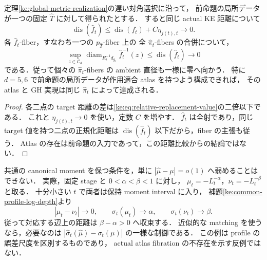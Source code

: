 \begin{corollary}[相対変更後の同じ射影による GH 実現]
\label{ke:relative-replacement-gh}
定理\ref{ke:global-metric-realization}の遅い対角選択に沿って，
前命題の局所データが一つの固定 $\widehat T$ に対して得られたとする．
すると同じ actual KE 距離について
\[
 \operatorname{dis}(\widehat f_t)
 \le\operatorname{dis}(f_t)+C\eta_{j(t),t}\longrightarrow0.
\]
各 $\widehat f_t$-fiber，すなわち一つの $p_{\widehat T}$-fiber 上の
全 $\widehat\pi_t$-fibers の合併について，
\[
 \sup_{z\in\mathcal C_d}
 \operatorname{diam}_{R_t^{-1}d_{g_t}}\widehat f_t^{-1}(z)
 \le\operatorname{dis}(\widehat f_t)\longrightarrow0
\]
である．従って個々の $\widehat\pi_t$-fibers の ambient 直径も一様に零へ向かう．
特に $d=5,6$ で前命題の局所データが作用適合 atlas を持つよう構成できれば，
その atlas と GH 実現は同じ $\widehat\pi_t$ によって達成される．
\end{corollary}

\begin{proof}
各二点の target 距離の差は\eqref{ke:eq:relative-replacement-value}の二倍以下である．
これと $\eta_{j(t),t}\to0$ を使い，定数 $C$ を増やす．
$\widehat f_t$ は全射であり，同じ target 値を持つ二点の正規化距離は
$\operatorname{dis}(\widehat f_t)$ 以下だから，fiber の主張も従う．
Atlas の存在は前命題の入力であって，この距離比較からの結論ではない．
\end{proof}

\begin{remark}
\label{ke:raw-moment-error-insufficient}
共通の canonical moment を保つ条件を，単に
$|\widehat\mu-\mu|=o(1)$ へ弱めることはできない．
実際，固定 stage と $0<\alpha<\beta<1$ に対し，
$\mu_t=-L_t^{-\alpha}$，$\nu_t=-L_t^{-\beta}$ と取る．
十分小さい $t$ で両者は保持 moment interval に入り，
補題\ref{ke:common-profile-log-depth}より
\[
 |\mu_t-\nu_t|\longrightarrow0,\qquad
 \sigma_t(\mu_t)\longrightarrow\alpha,\qquad
 \sigma_t(\nu_t)\longrightarrow\beta.
\]
従って対応する辺上の距離は $\beta-\alpha>0$ へ収束する．
近似的な matching を使うなら，必要なのは
$|\widehat\sigma_t(\widehat\mu)-\sigma_t(\mu)|$ の一様な制御である．
この例は profile の誤差尺度を区別するものであり，
actual atlas fibration の不存在を示す反例ではない．
\end{remark}
